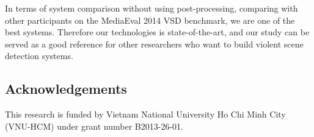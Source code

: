 \documentclass[twocolumn]{bmcart}%
\begin{document}
In terms of system comparison without using post-processing, comparing with other participants on the MediaEval 2014 VSD benchmark, we are one of the best systems. Therefore our technologies is state-of-the-art, and our study can be served as a good reference for other researchers who want to build violent scene detection systems. 


\begin{backmatter}

\section{Acknowledgements}
This research is funded by Vietnam National University Ho Chi Minh City (VNU-HCM) under grant number B2013-26-01.









\end{backmatter}
\end{document}
